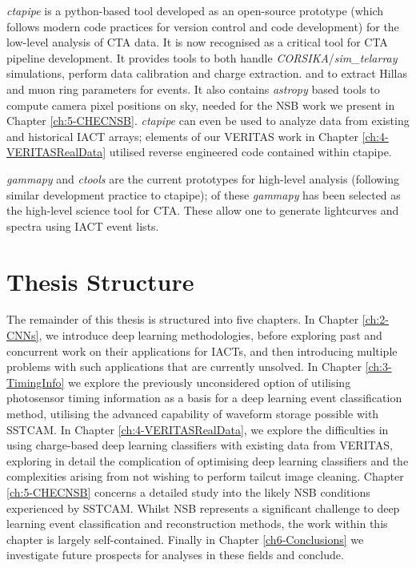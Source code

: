 \textit{ctapipe} is a python-based tool developed as an open-source prototype (which follows modern code practices for version control and code development) for the low-level analysis of CTA data. It is now recognised as a critical tool for CTA pipeline development. It provides tools to both handle \textit{CORSIKA}/\textit{sim\_telarray} simulations, perform data calibration and charge extraction. and to extract Hillas and muon ring parameters for events. It also contains \textit{astropy} based tools to compute camera pixel positions on sky, needed for the NSB work we present in Chapter \ref{ch:5-CHECNSB}. \textit{ctapipe} can even be used to analyze data from existing and historical IACT arrays; elements of our VERITAS work in Chapter \ref{ch:4-VERITASRealData} utilised reverse engineered code contained within ctapipe.

\textit{gammapy} and \textit{ctools} are the current prototypes for high-level analysis (following similar development practice to ctapipe); of these \textit{gammapy} has been selected as the high-level science tool for CTA. These allow one to generate lightcurves and spectra using IACT event lists. 

\section{Thesis Structure}
The remainder of this thesis is structured into five chapters. In Chapter \ref{ch:2-CNNs}, we introduce deep learning methodologies, before exploring past and concurrent work on their applications for IACTs, and then introducing multiple problems with such applications that are currently unsolved. In Chapter \ref{ch:3-TimingInfo} we explore the previously unconsidered option of utilising photosensor timing information as a basis for a deep learning event classification method, utilising the advanced capability of waveform storage possible with SSTCAM. In Chapter \ref{ch:4-VERITASRealData}, we explore the difficulties in using charge-based deep learning classifiers with existing data from VERITAS, exploring in detail the complication of optimising deep learning classifiers and the complexities arising from not wishing to perform tailcut image cleaning. Chapter \ref{ch:5-CHECNSB} concerns a detailed study into the likely NSB conditions experienced by SSTCAM. Whilst NSB represents a significant challenge to deep learning event classification and reconstruction methods, the work within this chapter is largely self-contained. Finally in Chapter \ref{ch6-Conclusions} we investigate future prospects for analyses in these fields and conclude.